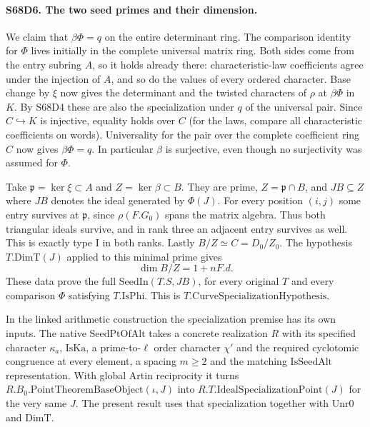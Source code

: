\paragraph{S68D6. The two seed primes and their dimension.}
We claim that $\beta\Phi=q$ on the entire determinant ring.
The comparison identity for $\Phi$ lives initially in the complete
universal matrix ring. Both sides come from the entry subring
$A$, so it holds already there: characteristic-law coefficients
agree under the injection of $A$, and so do the values of every
ordered character. Base change by $\xi$ now gives the determinant
and the twisted characters of $\rho$ at $\beta\Phi$ in $K$.
By S68D4 these are also the specialization under $q$ of the
universal pair. Since $C\hookrightarrow K$ is injective, equality
holds over $C$ (for the laws, compare all characteristic
coefficients on words). Universality for the pair over the
complete coefficient ring $C$ now gives $\beta\Phi=q$.
In particular $\beta$ is surjective, even though no surjectivity
was assumed for $\Phi$.

Take $\mathfrak p=\ker\xi\subset A$ and $Z=\ker\beta\subset B$.
They are prime, $Z=\mathfrak p\cap B$, and
$J B\subseteq Z$ where $JB$ denotes the ideal generated by
$\Phi(J)$. For every position $(i,j)$ some entry survives at
$\mathfrak p$, since $\rho(F.G_0)$ spans the matrix algebra.
Thus both triangular ideals survive, and in rank three an adjacent
entry survives as well. This is exactly type I in both ranks.
Lastly $B/Z\simeq C=D_0/Z_0$. The hypothesis $T.\mathrm{DimT}(J)$
applied to this minimal prime gives
\[
                 \dim B/Z=1+nF.d .
\]
These data prove the full
$\mathrm{SeedIn}(T.S,J B)$, for every original $T$ and every
comparison $\Phi$ satisfying $T.\mathrm{IsPhi}$.
This is $T.\mathrm{CurveSpecializationHypothesis}$.

In the linked arithmetic construction the specialization premise
has its own inputs. The native $\mathrm{SeedPtOfAlt}$ takes a
concrete realization $R$ with its specified character $\kappa_a$,
$\mathrm{IsKa}$, a prime-to-$\ell$ order character $\chi'$ and
the required cyclotomic congruence at every element, a spacing
$m\ge2$ and the matching $\mathrm{IsSeedAlt}$ representation.
With global Artin reciprocity it turns
$R.B_0.\mathrm{PointTheoremBaseObject}(\iota,J)$ into
$R.T.\mathrm{IdealSpecializationPoint}(J)$ for the very same $J$.
The present result uses that specialization together with
$\mathrm{Unr0}$ and $\mathrm{DimT}$.
